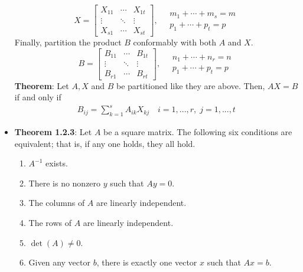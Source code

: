\documentclass{report}
\begin{document}
\begin{itemize}
            \[
                X =
                \begin{bmatrix}
                    X_{11} & \cdots & X_{1t} \\
                    \vdots & \ddots & \vdots \\
                    X_{s1} & \cdots & X_{st}
                \end{bmatrix}, \quad
                \begin{array}{l}
                    m_1 + \cdots + m_s = m \\
                    p_1 + \cdots + p_t = p
                \end{array}
            \]
            Finally, partition the product $B$ conformably with both $A$ and $X$.
            \[
                B =
                \begin{bmatrix}
                    B_{11} & \cdots & B_{1t} \\
                    \vdots & \ddots & \vdots \\
                    B_{r1} & \cdots & B_{rt}
                \end{bmatrix}, \quad
                \begin{array}{l}
                    n_1 + \cdots + n_r = n \\
                    p_1 + \cdots + p_t = p
                \end{array}
            \]
            \bigbreak \noindent 
            \textbf{Theorem}: Let $A,X$ and $B$ be partitioned like they are above. Then, $AX = B$ if and only if 
            \begin{align*}
                B_{ij} = \sum_{k=1}^{s}A_{ik}X_{kj} \quad i=1,...,r,\; j=1,...,t
            \end{align*}
        \item \textbf{Theorem 1.2.3}: Let $A$ be a square matrix. The following six conditions are equivalent; 
            that is, if any one holds, they all hold.
            \begin{enumerate}[label=(\alph*)]
                \item $A^{-1}$ exists.
                \item There is no nonzero $y$ such that $Ay = 0$.
                \item The columns of $A$ are linearly independent.
                \item The rows of $A$ are linearly independent.
                \item $\det(A) \neq 0$.
                \item Given any vector $b$, there is exactly one vector $x$ such that $Ax = b$.

\end{enumerate}
\end{itemize}
\end{document}
